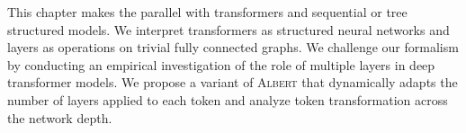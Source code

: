 This chapter makes the parallel with transformers and sequential or tree structured models. We interpret transformers as structured neural networks and layers as operations on trivial fully connected graphs. We challenge our formalism by conducting an empirical investigation of the role of multiple layers in deep transformer models. We propose a variant of \textsc{Albert} \parencite{simoulin_2021b} that dynamically adapts the number of layers applied to each token and analyze token transformation across the network depth.












